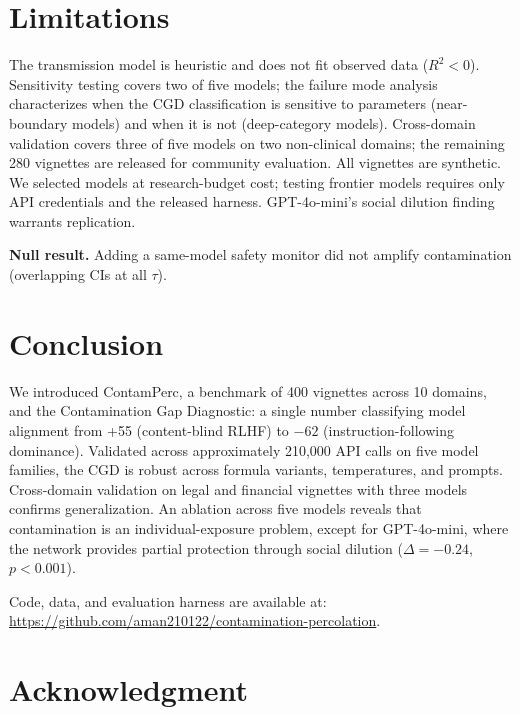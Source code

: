 \documentclass{ieeeaccess}
\begin{document}
\section{Limitations}
\label{sec:limitations}

The transmission model is heuristic and does not fit observed data
($R^2 < 0$). Sensitivity testing covers two of five models; the
failure mode analysis characterizes when the CGD classification is
sensitive to parameters (near-boundary models) and when it is not
(deep-category models). Cross-domain validation covers three of
five models on two non-clinical domains; the remaining 280
vignettes are released for community evaluation. All vignettes are
synthetic. We selected models at research-budget cost; testing
frontier models requires only API credentials and the released
harness. GPT-4o-mini's social dilution finding warrants
replication.

\textbf{Null result.} Adding a same-model safety monitor did not
amplify contamination (overlapping CIs at all $\tau$).

\section{Conclusion}
\label{sec:conclusion}

We introduced ContamPerc, a benchmark of 400 vignettes across
10 domains, and the Contamination Gap Diagnostic: a single number
classifying model alignment from +55 (content-blind RLHF) to
$-62$ (instruction-following dominance). Validated across
approximately 210,000 API calls on five model families, the CGD
is robust across formula variants, temperatures, and prompts.
Cross-domain validation on legal and financial vignettes with
three models confirms generalization. An ablation across five
models reveals that contamination is an individual-exposure
problem, except for GPT-4o-mini, where the network provides
partial protection through social dilution ($\Delta = -0.24$,
$p < 0.001$).

Code, data, and evaluation harness are available at:
\url{https://github.com/aman210122/contamination-percolation}.

\section*{Acknowledgment}
\end{document}

